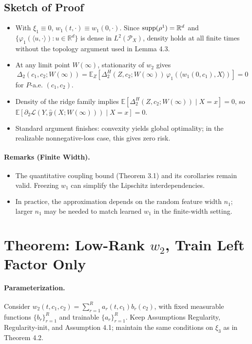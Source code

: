 \documentclass{article}
\begin{document}
\subsection*{Sketch of Proof}
\begin{itemize}[leftmargin=1.5em]
    \item With $\xi_{1} \equiv 0$, $w_{1}(t, \cdot) \equiv w_{1}(0, \cdot)$. Since ${\rm supp}(\rho^{1}) = \mathbb{R}^{d}$ and $\{\varphi_{1}(\langle u, \cdot\rangle): u \in \mathbb{R}^{d}\}$ is dense in $L^2(\mathcal{P}_{X})$, density holds at all finite times without the topology argument used in Lemma 4.3.
    \item At any limit point $W(\infty)$, stationarity of $w_{2}$ gives
    \[
        \Delta_{2}(c_{1},c_{2};W(\infty)) = \mathbb{E}_{Z}\!\left[\Delta_{2}^{H}(Z,c_{2};W(\infty)) \,\varphi_{1}(\langle w_{1}(0,c_{1}), X\rangle)\right] = 0
    \]
    for $P$-a.e. $(c_{1},c_{2})$.
    \item Density of the ridge family implies $\mathbb{E}\!\left[\Delta_{2}^{H}(Z, c_{2}; W(\infty)) \mid X = x\right] = 0$, so $\mathbb{E}\!\left[ \partial_{2}\mathcal{L}(Y, \hat{y}(X; W(\infty))) \mid X = x \right] = 0$.
    \item Standard argument finishes: convexity yields global optimality; in the realizable nonnegative-loss case, this gives zero risk.
\end{itemize}

\paragraph{Remarks (Finite Width).}
\begin{itemize}[leftmargin=1.5em]
    \item The quantitative coupling bound (Theorem 3.1) and its corollaries remain valid. Freezing $w_{1}$ can simplify the Lipschitz interdependencies.
    \item In practice, the approximation depends on the random feature width $n_{1}$; larger $n_{1}$ may be needed to match learned $w_{1}$ in the finite-width setting.
\end{itemize}

\section{Theorem: Low-Rank $w_2$, Train Left Factor Only}

\paragraph{Parameterization.} Consider $w_{2}(t, c_{1}, c_{2}) = \sum_{r=1}^{R} a_{r}(t, c_{1}) b_{r}(c_{2})$, with fixed measurable functions $\{b_{r}\}_{r=1}^{R}$ and trainable $\{a_{r}\}_{r=1}^{R}$. Keep Assumptions Regularity, Regularity-init, and Assumption 4.1; maintain the same conditions on $\xi_3$ as in Theorem 4.2.
\end{document}
